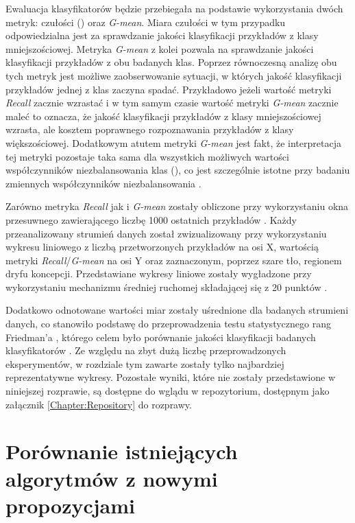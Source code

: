 Ewaluacja klasyfikatorów będzie przebiegała na podstawie wykorzystania dwóch metryk: czułości () oraz \textit{G-mean}. Miara czułości w tym przypadku odpowiedzialna jest za sprawdzanie jakości klasyfikacji przykładów z klasy mniejszościowej. Metryka \textit{G-mean} z kolei pozwala na sprawdzanie jakości klasyfikacji przykładów z obu badanych klas. Poprzez równoczesną analizę obu tych metryk jest możliwe zaobserwowanie sytuacji, w których jakość klasyfikacji przykładów jednej z klas zaczyna spadać. Przykładowo jeżeli wartość metryki \textit{Recall} zacznie wzrastać i w tym samym czasie wartość metryki \textit{G-mean} zacznie maleć to oznacza, że jakość klasyfikacji przykładów z klasy mniejszościowej wzrasta, ale kosztem poprawnego rozpoznawania przykładów z klasy większościowej. Dodatkowym atutem metryki \textit{G-mean} jest fakt, że interpretacja tej metryki pozostaje taka sama dla wszystkich możliwych wartości współczynników niezbalansowania klas (), co jest szczególnie istotne przy badaniu zmiennych współczynników niezbalansowania \cite{Article:TypyPrzykladow}.

Zarówno metryka \textit{Recall} jak i \textit{G-mean} zostały obliczone przy wykorzystaniu okna przesuwnego zawierającego liczbę 1000 ostatnich przykładów \cite{Article:Evaluation}. Każdy przeanalizowany strumień danych został zwizualizowany przy wykorzystaniu wykresu liniowego z liczbą przetworzonych przykładów na osi X, wartością metryki \textit{Recall}/\textit{G-mean} na osi Y oraz zaznaczonym, poprzez szare tło, regionem dryfu koncepcji. Przedstawiane wykresy liniowe zostały wygładzone przy wykorzystaniu mechanizmu średniej ruchomej składającej się z 20 punktów \cite{Article:TypyPrzykladow}.

Dodatkowo odnotowane wartości miar zostały uśrednione dla badanych strumieni danych, co stanowiło podstawę do przeprowadzenia testu statystycznego rang Friedman'a \cite{Article:Friedman}, którego celem było porównanie jakości klasyfikacji badanych klasyfikatorów \cite{Article:TypyPrzykladow}. Ze względu na zbyt dużą liczbę przeprowadzonych eksperymentów, w rozdziale tym zawarte zostały tylko najbardziej reprezentatywne wykresy. Pozostałe wyniki, które nie zostały przedstawione w niniejszej rozprawie, są dostępne do wglądu w repozytorium, dostępnym jako załącznik \ref{Chapter:Repository} do rozprawy.

\section{Porównanie istniejących algorytmów z nowymi propozycjami}
\label{Section:AlgorithmsComparison}

